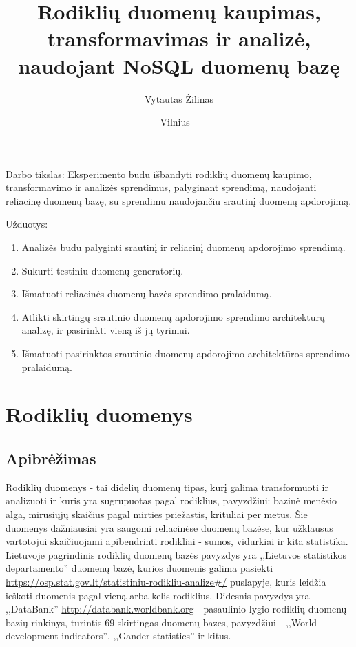 \documentclass{VUMIFPSkursinis}
\title{Rodiklių duomenų kaupimas, transformavimas ir analizė, naudojant NoSQL duomenų bazę}
\author{Vytautas Žilinas}
\date{Vilnius – \the\year}
\begin{document}
	
\maketitle
\cleardoublepage{}
\setcounter{page}{2}

\tableofcontents


Darbo tikslas: Eksperimento būdu išbandyti rodiklių duomenų kaupimo, transformavimo ir analizės sprendimus, palyginant sprendimą, 
naudojanti reliacinę duomenų bazę, su sprendimu naudojančiu srautinį duomenų apdorojimą.

Užduotys:
\begin{enumerate}
    \item Analizės budu palyginti srautinį ir reliacinį duomenų apdorojimo sprendimą.
    \item Sukurti testiniu duomenų generatorių.
    \item Išmatuoti reliacinės duomenų bazės sprendimo pralaidumą.
    \item Atlikti skirtingų srautinio duomenų apdorojimo sprendimo architektūrų analizę, ir pasirinkti vieną iš jų tyrimui.
    \item Išmatuoti pasirinktos srautinio duomenų apdorojimo architektūros sprendimo pralaidumą.
\end{enumerate}


\section{Rodiklių duomenys}

\subsection{Apibrėžimas}

Rodiklių duomenys - tai didelių duomenų tipas, kurį galima transformuoti ir analizuoti ir kuris yra sugrupuotas pagal rodiklius, 
pavyzdžiui: bazinė menėsio alga, mirusiųjų skaičius pagal mirties priežastis, krituliai per metus. Šie duomenys dažniausiai yra saugomi reliacinėse duomenų bazėse, 
kur užklausus vartotojui skaičiuojami apibendrinti rodikliai - sumos, vidurkiai ir kita statistika.
Lietuvoje pagrindinis rodiklių duomenų bazės pavyzdys yra ,,Lietuvos statistikos departamento'' duomenų bazė, kurios duomenis galima pasiekti
\url{https://osp.stat.gov.lt/statistiniu-rodikliu-analize#/} puslapyje, kuris leidžia ieškoti duomenis pagal vieną arba kelis rodiklius. Didesnis pavyzdys yra ,,DataBank''
\url{http://databank.worldbank.org} - pasaulinio lygio rodiklių duomenų bazių rinkinys, turintis 69 skirtingas duomenų bazes, pavyzdžiui - ,,World development indicators'',
,,Gander statistics'' ir kitus\cite{databank-stats}.
\end{document}
